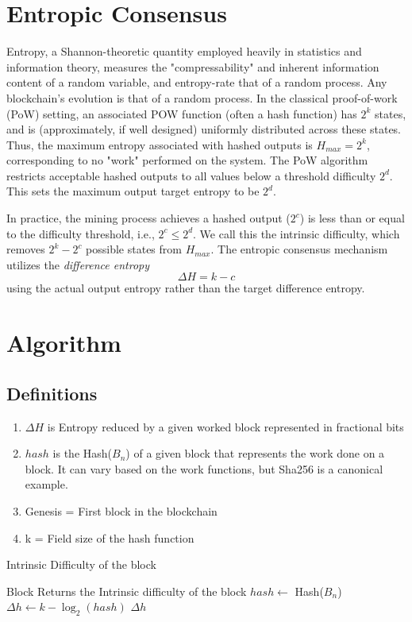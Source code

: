 
\section{Entropic Consensus}

Entropy, a Shannon-theoretic quantity employed heavily in statistics and information theory, measures the "compressability" and inherent information content of a random variable, and entropy-rate that of a random process. Any blockchain's evolution is that of a random process. In the classical proof-of-work (PoW) setting, an associated POW function (often a hash function) has $2^k$ states, and is (approximately, if well designed) uniformly distributed across these states. Thus, the maximum entropy associated with hashed outputs is $H_{max} = 2^k$, corresponding to no "work" performed on the system. The PoW algorithm restricts acceptable hashed outputs to all values below a threshold difficulty $2^d$. This sets the maximum output target entropy to be $2^d$.

In practice, the mining process achieves a hashed output ($2^c$) is less than or equal to the difficulty threshold, i.e., $2^c \le 2^d$. We call this the intrinsic difficulty, which removes $2^k - 2^c$ possible states from $H_{max}$. The entropic consensus mechanism utilizes the {\em difference entropy} $$\Delta H= k - c$$ using the actual output entropy rather than the target difference entropy.

\section{Algorithm}
\subsection{Definitions}
\begin{enumerate}
    \item $\Delta H$ is Entropy reduced by a given worked block represented in fractional bits
    \item $hash$ is the Hash($B_n$) of a given block that represents the work done on a block. It can vary based on the work functions, but Sha256 is a canonical example.
    \item Genesis = First block in the blockchain
    \item k = Field size of the hash function
\end{enumerate}

\begin{algorithm}
\caption{Intrinsic Difficulty of the block}
\label{Intrinsic_Difficulty}
\begin{algorithmic}[2]
\Require Block
\Ensure Returns the Intrinsic difficulty of the block
\State $hash \gets$ Hash($B_n$)
\State $\Delta h \gets k - \log_2(hash)$
\State \Return $\Delta h$
\EndFunction
\end{algorithmic}
\end{algorithm}

